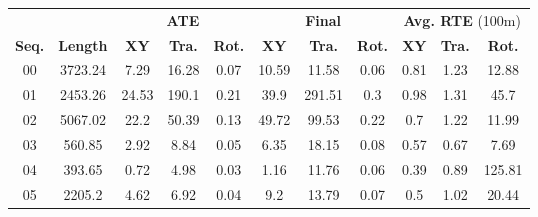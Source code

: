 \begin{table}[h]
    \begin{tabular}{c|c|ccc|ccc|ccc}
        \hline
                      &                 & \multicolumn{3}{c|}{\textbf{ATE}} & \multicolumn{3}{c|}{\textbf{Final}} & \multicolumn{3}{c}{\textbf{Avg. RTE} (100m)}                                                                                             \\
        \textbf{Seq.} & \textbf{Length} & \textbf{XY}                       & \textbf{Tra.}                       & \textbf{Rot.}                                & \textbf{XY} & \textbf{Tra.} & \textbf{Rot.} & \textbf{XY} & \textbf{Tra.} & \textbf{Rot.} \\
        \hline \hline
        00            & 3723.24         & 7.29                              & 16.28                               & 0.07                                         & 10.59       & 11.58         & 0.06          & 0.81        & 1.23          & 12.88         \\
        01            & 2453.26         & 24.53                             & 190.1                               & 0.21                                         & 39.9        & 291.51        & 0.3           & 0.98        & 1.31          & 45.7          \\
        02            & 5067.02         & 22.2                              & 50.39                               & 0.13                                         & 49.72       & 99.53         & 0.22          & 0.7         & 1.22          & 11.99         \\
        03            & 560.85          & 2.92                              & 8.84                                & 0.05                                         & 6.35        & 18.15         & 0.08          & 0.57        & 0.67          & 7.69          \\
        04            & 393.65          & 0.72                              & 4.98                                & 0.03                                         & 1.16        & 11.76         & 0.06          & 0.39        & 0.89          & 125.81        \\
        05            & 2205.2          & 4.62                              & 6.92                                & 0.04                                         & 9.2         & 13.79         & 0.07          & 0.5         & 1.02          & 20.44         \\

\end{tabular}
\end{table}

